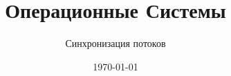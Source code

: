 \documentclass[12pt,t]{beamer}
\title{Операционные Системы}
\subtitle{Синхронизация потоков}
\date{\today}
\begin{document}
  \begin{frame}
    \titlepage
  \end{frame}
  
  
  
  
  
  
  
\end{document}
